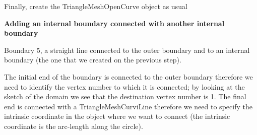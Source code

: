 \begin{DoxyItemize}
\item Finally, create the {\ttfamily Triangle\+Mesh\+Open\+Curve} object as usual
\end{DoxyItemize}

 
\begin{DoxyCodeInclude}

\end{DoxyCodeInclude}






{\bfseries  Adding an internal boundary connected with another internal boundary }

Boundary 5, a straight line connected to the outer boundary and to an internal boundary (the one that we created on the previous step).

The initial end of the boundary is connected to the outer boundary therefore we need to identify the vertex number to which it is connected; by looking at the sketch of the domain we see that the destination vertex number is 1. The final end is connected with a {\ttfamily Triangle\+Mesh\+Curvi\+Line} therefore we need to specify the intrinsic coordinate in the object where we want to connect (the intrinsic coordinate is the arc-\/length along the circle).

